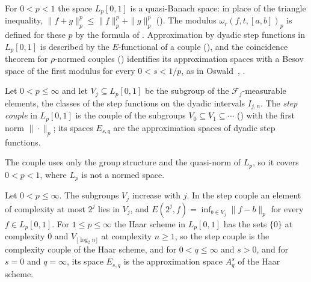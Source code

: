 For $0 < p < 1$ the space $L_p[0, 1]$ is a quasi-Banach space: in place of the triangle
inequality, $\|f + g\|_p^p \leq \|f\|_p^p + \|g\|_p^p$ (). The modulus
$\omega_r(f, t, [a, b])_p$ is defined for these $p$ by the formula of
. Approximation by dyadic step functions in $L_p[0, 1]$ is described by
the $E$-functional of a couple (), and the coincidence theorem for
$\rho$-normed couples () identifies its approximation spaces
with a Besov space of the first modulus for every $0 < s < 1/p$, as in
Oswald~\cite[Theorem~6]{Oswald1980}, \cite[(7)]{Oswald2018}.

\begin{definition}
\label{def:step-couple}
\leanok
{}
Let $0 < p \leq \infty$ and let $V_j \subseteq L_p[0, 1]$ be the subgroup of the
$\mathcal{F}_j$-measurable elements, the classes of the step functions on the dyadic intervals
$I_{j,n}$. The \emph{step couple} in $L_p[0, 1]$ is the couple of the subgroups
$V_0 \subseteq V_1 \subseteq \cdots$ () with the first norm
$\|\cdot\|_p$; its spaces $E_{s, q}$ are the approximation spaces of dyadic step functions.
\end{definition}

The couple uses only the group structure and the quasi-norm of $L_p$, so it covers
$0 < p < 1$, where $L_p$ is not a normed space.

\begin{lemma}
\label{lem:step-couple}
\leanok
{}
Let $0 < p \leq \infty$. The subgroups $V_j$ increase with $j$. In the step couple an element of
complexity at most $2^j$ lies in $V_j$, and $E(2^j, f) = \inf_{b \in V_j} \|f - b\|_p$ for every
$f \in L_p[0, 1]$. For $1 \leq p \leq \infty$ the Haar scheme in $L_p[0, 1]$ has the sets $\{0\}$
at complexity $0$ and $V_{\lfloor \log_2 n \rfloor}$ at complexity $n \geq 1$, so the step couple
is the complexity couple of the Haar scheme, and for $0 < q \leq \infty$ and $s > 0$, and for
$s = 0$ and $q = \infty$, its space $E_{s, q}$ is the approximation space $A^s_q$ of the Haar
scheme.
\end{lemma}

